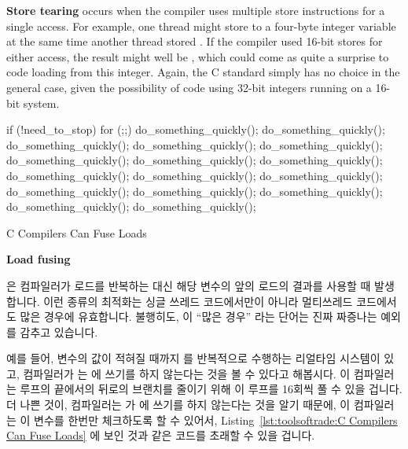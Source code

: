{{{\bf Store tearing} occurs when the compiler uses multiple store
instructions for a single access.
For example, one thread might store  to a four-byte integer
variable at the same time another thread stored .
If the compiler used 16-bit stores for either access, the result
might well be , which could come as quite a surprise to
code loading from this integer.
Again, the C standard simply has no choice in the general case, given
the possibility of code using 32-bit integers running on a 16-bit system.
\fi

\begin{listing}[tbp]
\begin{linelabel}
\begin{VerbatimL}[commandchars=\\\[\]]
if (!need_to_stop)
	for (;;) {\lnlbl[loop:b]
		do_something_quickly();
		do_something_quickly();
		do_something_quickly();
		do_something_quickly();
		do_something_quickly();
		do_something_quickly();
		do_something_quickly();
		do_something_quickly();
		do_something_quickly();
		do_something_quickly();
		do_something_quickly();
		do_something_quickly();
		do_something_quickly();
		do_something_quickly();
		do_something_quickly();
		do_something_quickly();
	}\lnlbl[loop:e]
\end{VerbatimL}
\end{linelabel}
\caption{C Compilers Can Fuse Loads}
\label{lst:toolsoftrade:C Compilers Can Fuse Loads}
\end{listing}

{\bf Load fusing{ 은 컴파일러가 로드를 반복하는 대신 해당 변수의 앞의 로드의
결과를 사용할 때 발생합니다.
이런 종류의 최적화는 싱글 쓰레드 코드에서만이 아니라 멀티쓰레드 코드에서도 많은
경우에 유효합니다.
불행히도, 이 ``많은 경우'' 라는 단어는 진짜 짜증나는 예외를 감추고 있습니다.

예를 들어,  변수의 값이 적혀질 때까지
 를 반복적으로 수행하는 리얼타임 시스템이 있고,
컴파일러가  는  에 쓰기를 하지
않는다는 것을 볼 수 있다고 해봅시다.
이 컴파일러는 루프의 끝에서의 뒤로의 브랜치를 줄이기 위해 이 루프를 16회씩 풀
수 있을 겁니다.
더 나쁜 것이, 컴파일러는  가  에
쓰기를 하지 않는다는 것을 알기 때문에, 이 컴파일러는 이 변수를 한번만
체크하도록 할 수 있어서,
Listing~\ref{lst:toolsoftrade:C Compilers Can Fuse Loads} 에 보인 것과 같은
코드를 초래할 수 있을 겁니다.
\iffalse

}}}}
